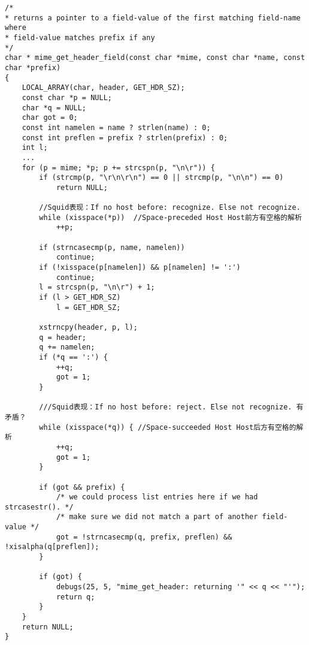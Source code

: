 \begin{lstlisting}[title=squid/src/mime\_header.cc  line:22]
/*
* returns a pointer to a field-value of the first matching field-name where
* field-value matches prefix if any
*/
char * mime_get_header_field(const char *mime, const char *name, const char *prefix)
{
	LOCAL_ARRAY(char, header, GET_HDR_SZ);
	const char *p = NULL;
	char *q = NULL;
	char got = 0;
	const int namelen = name ? strlen(name) : 0;
	const int preflen = prefix ? strlen(prefix) : 0;
	int l;
	...
	for (p = mime; *p; p += strcspn(p, "\n\r")) {
		if (strcmp(p, "\r\n\r\n") == 0 || strcmp(p, "\n\n") == 0)
			return NULL;

		//Squid表现：If no host before: recognize. Else not recognize.
		while (xisspace(*p))  //Space-preceded Host Host前方有空格的解析 
			++p;

		if (strncasecmp(p, name, namelen))
			continue;
		if (!xisspace(p[namelen]) && p[namelen] != ':')
			continue;
		l = strcspn(p, "\n\r") + 1;
		if (l > GET_HDR_SZ)
			l = GET_HDR_SZ;

		xstrncpy(header, p, l);
		q = header;
		q += namelen;
		if (*q == ':') {
			++q;
			got = 1;
		}

		///Squid表现：If no host before: reject. Else not recognize. 有矛盾？
		while (xisspace(*q)) { //Space-succeeded Host Host后方有空格的解析 
			++q;
			got = 1;
		}

		if (got && prefix) {
			/* we could process list entries here if we had strcasestr(). */
			/* make sure we did not match a part of another field-value */
			got = !strncasecmp(q, prefix, preflen) && !xisalpha(q[preflen]);
		}

		if (got) {
			debugs(25, 5, "mime_get_header: returning '" << q << "'");
			return q;
		}
	}
	return NULL;
}
\end{lstlisting}
